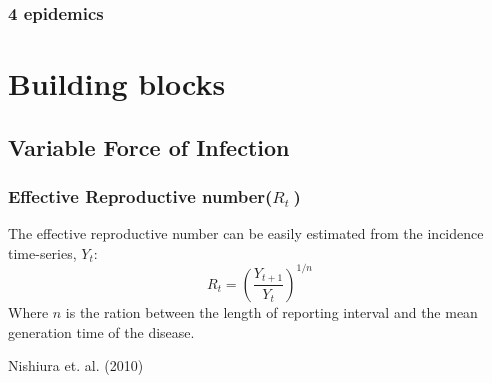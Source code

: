 \documentclass[10pt,compress,notheorems]{beamer}
\def \rr {$R_{t}\:$}
\begin{document}
\begin{frame}[fragile]
\frametitle{4 epidemics}
\begin{flushleft}
 \begin{figure}
  \end{figure}
\end{flushleft}

\end{frame}

\section{Building blocks}

\subsection{Variable Force of Infection}
\begin{frame}
\frametitle{Effective Reproductive number(\rr)}
The effective reproductive number can be easily estimated from the incidence 
time-series, $Y_t$:
\begin{equation}
\label{eq:Rtestimate}
R_t = \left( \frac{Y_{t+1}}{Y_t}\right)^{1/n}
\end{equation}
Where $n$ is the ration between the length of reporting interval and 
the mean generation time of the disease.
\begin{flushright}
 Nishiura et. al. (2010)
\end{flushright}
\end{frame}
\end{document}
